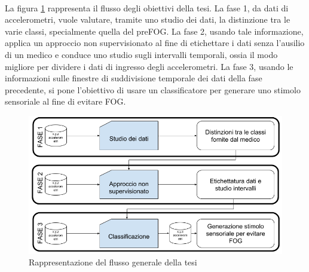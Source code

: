 \\ La figura \ref{FlussoTesiGenerale} rappresenta il flusso degli obiettivi della tesi. La fase 1, da dati di accelerometri, vuole valutare, tramite uno studio dei dati, la distinzione tra le varie classi, specialmente quella del preFOG. 
La fase 2, usando tale informazione, applica un approccio non  supervisionato al fine di etichettare i dati senza l'ausilio di un medico e conduce uno studio sugli intervalli temporali, ossia il modo migliore per dividere i dati di ingresso degli accelerometri. La fase 3, usando le informazioni sulle finestre di suddivisione temporale dei dati della fase precedente, si pone l'obiettivo di usare un classificatore per generare uno stimolo sensoriale al fine di evitare FOG.
\begin{figure}[]
	\centering
	\includegraphics[width=1\textwidth]{images/FlussoTesiGenerale.png}
	\caption{Rappresentazione del flusso generale della tesi}
	\label{FlussoTesiGenerale}
\end{figure}
